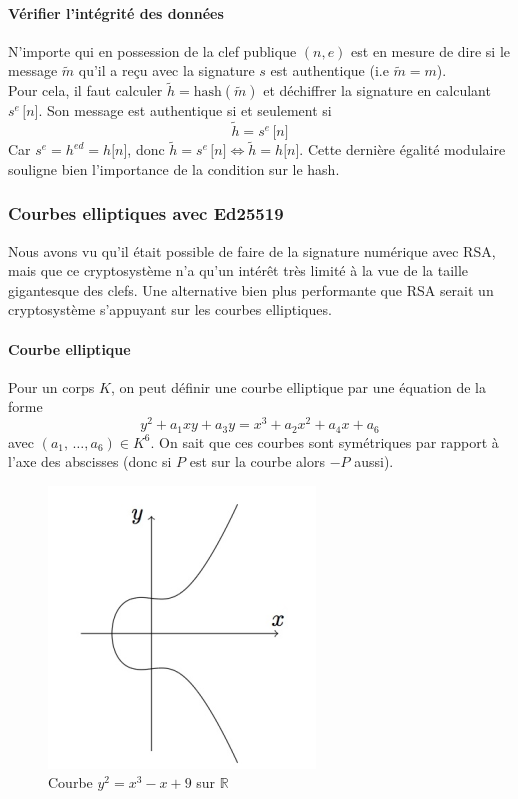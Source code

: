 \documentclass[a4paper, 12pt]{article}
\begin{document}
\paragraph{Vérifier l'intégrité des données}
N'importe qui en possession de la clef publique $(n, e)$ est en mesure de dire si le message $\tilde{m}$ qu'il a reçu avec la signature $s$ est authentique (i.e $\tilde{m} = m$). \\
Pour cela, il faut calculer $\tilde{h} = \text{hash}(\tilde{m})$ et déchiffrer la signature en calculant $s^e \, \lbrack n \rbrack$. Son message est authentique si et seulement si 
$$
\tilde{h} = s^e \, \lbrack n \rbrack
$$
Car $s^e = h^{ed} = h \lbrack n \rbrack$, donc $\tilde{h} = s^e \, \lbrack n \rbrack \Leftrightarrow \tilde{h} = h \lbrack n \rbrack$. Cette dernière égalité modulaire souligne bien l'importance de la condition sur le hash.

\subsubsection{Courbes elliptiques avec Ed25519}\label{courbeEd25519}
Nous avons vu qu'il était possible de faire de la signature numérique avec RSA, mais que ce cryptosystème n'a qu'un intérêt très limité à la vue de la taille gigantesque des clefs. Une alternative bien plus performante que RSA serait un cryptosystème s'appuyant sur les courbes elliptiques.
\paragraph{Courbe elliptique}
\noindent Pour un corps $K$, on peut définir une courbe elliptique par une équation de la forme 
$$
y^2 + a_1xy + a_3y = x^3 + a_2x^2 +a_4x + a_6
$$
avec $(a_1,\, \dots, a_6) \in K^6$. On sait que ces courbes sont symétriques par rapport à l'axe des abscisses (donc si $P$ est sur la courbe alors $-P$ aussi). \\

\begin{figure}[h]
	\centering
	\includegraphics[width=.5\textwidth]{img/courbe1.png}
	\caption{Courbe $y^2 = x^3 - x + 9$ sur $\mathbb{R}$}
	\label{courbe1}
\end{figure}
\end{document}
